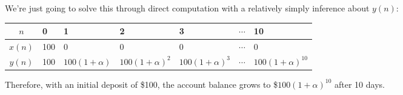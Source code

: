 \documentclass{article}
\begin{document}
We're just going to solve this through direct computation with a relatively simply inference about $y(n)$:

\vspace{1cm}

\begin{tabularx}{\linewidth}{| c || Y Y Y Y Y Y |}
	\hline
	$n$ & 0 & 1 & 2 & 3 & $\cdots$ & 10 \\
	\hline
	$x(n)$ & 100 & 0 & 0 & 0 & $\cdots$ & 0 \\
	$y(n)$ & 100 & $100(1 + \alpha)$ & $100(1 + \alpha)^2$ & $100(1 + \alpha)^3$ & $\cdots$ & $100(1 + \alpha)^{10}$ \\
	\hline
\end{tabularx}

\vspace{1cm}

Therefore, with an initial deposit of \$100, the account balance grows to \$$100(1 + \alpha)^{10}$ after 10 days.
\end{document}

